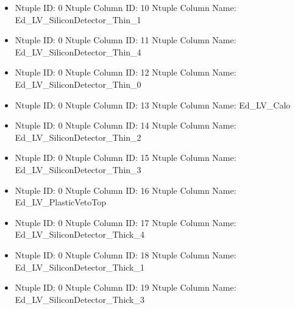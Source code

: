 \documentclass[8pt]{beamer}
\begin{document}
\begin{frame}
\begin{itemize}
        \item Ntuple ID: 0 Ntuple Column ID: 10 Ntuple Column Name: Ed\_LV\_SiliconDetector\_Thin\_1
        
        \item Ntuple ID: 0 Ntuple Column ID: 11 Ntuple Column Name: Ed\_LV\_SiliconDetector\_Thin\_4
        
        \item Ntuple ID: 0 Ntuple Column ID: 12 Ntuple Column Name: Ed\_LV\_SiliconDetector\_Thin\_0
        
        \item Ntuple ID: 0 Ntuple Column ID: 13 Ntuple Column Name: Ed\_LV\_Calo
        
        \item Ntuple ID: 0 Ntuple Column ID: 14 Ntuple Column Name: Ed\_LV\_SiliconDetector\_Thin\_2
        
        \item Ntuple ID: 0 Ntuple Column ID: 15 Ntuple Column Name: Ed\_LV\_SiliconDetector\_Thin\_3
        
        \item Ntuple ID: 0 Ntuple Column ID: 16 Ntuple Column Name: Ed\_LV\_PlasticVetoTop
        
        \item Ntuple ID: 0 Ntuple Column ID: 17 Ntuple Column Name: Ed\_LV\_SiliconDetector\_Thick\_4
        
        \item Ntuple ID: 0 Ntuple Column ID: 18 Ntuple Column Name: Ed\_LV\_SiliconDetector\_Thick\_1
        
        \item Ntuple ID: 0 Ntuple Column ID: 19 Ntuple Column Name: Ed\_LV\_SiliconDetector\_Thick\_3
        
        \end{itemize}
        
            \end{frame}
            
\end{document}
